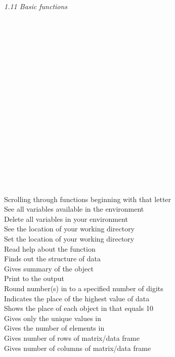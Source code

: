 \textit{1.11 Basic functions} \\
\\
\begin{minipage}[t]{.4\textwidth}
\vspace*{-8pt}
 \\ 					
 \\ 					 
 \\  		
 \\ 	 		
 \\ 		
 \\ 
 \\ 		
 \\ 			
 \\ 		
 \\  		  
 \\ 			 
 \\ 	
 \\ 		
 \\ 		
 \\ 		
 \\ 				
\end{minipage}
\begin{minipage}[t]{.6\textwidth}
Scrolling through functions beginning with that letter  \\
See all variables available in the environment \\
Delete all variables in your environment \\
See the location of your working directory  \\
Set the location of your working directory  \\
Read help about the function  \\
Finds out the structure of data   \\
Gives summary of the object  \\
Print  to the output \\
Round number(s) in  to a specified number of digits \\
Indicates the place of the highest value of data  \\
Shows the place of each object in  that equals 10 \\
Gives only the unique values in  \\
Gives the number of elements in  \\
Gives number of rows of matrix/data frame  \\
Gives number of columns of matrix/data frame 
\end{minipage}
\vspace*{.5cm}

